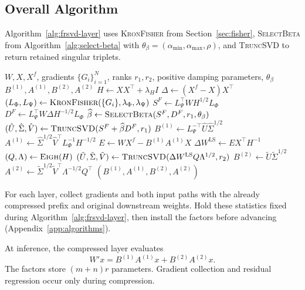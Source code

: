 \documentclass[11pt]{article}
\begin{document}
\subsection{Overall Algorithm}\label{sec:overall-algo}

Algorithm~\ref{alg:frsvd-layer} uses \textsc{KronFisher} from Section~\ref{sec:fisher}, \textsc{SelectBeta} from Algorithm~\ref{alg:select-beta} with $\theta_\beta=(\alpha_{\min},\alpha_{\max},\rho)$, and \textsc{TruncSVD} to return retained singular triplets.

\begin{algorithm}[t]
\caption{FR-SVD for one weight matrix}
\label{alg:frsvd-layer}
\small
\begin{algorithmic}[1]
\Require $W,X,X^f$, gradients $\{G_i\}_{i=1}^N$, ranks $r_1,r_2$, positive damping parameters, $\theta_\beta$
\Ensure $B^{(1)},A^{(1)},B^{(2)},A^{(2)}$
\State $H\gets XX^\top+\lambda_H I$
\State $\Delta\gets(X^f-X)X^\top$
\State $(L_\Phi,L_\Psi)\gets\Call{KronFisher}{\{G_i\},\lambda_\Phi,\lambda_\Psi}$
\State $S^F\gets L_\Psi^\top WH^{1/2}L_\Phi$
\State $D^F\gets L_\Psi^\top W\Delta H^{-1/2}L_\Phi$
\State $\widehat\beta\gets\Call{SelectBeta}{S^F,D^F,r_1,\theta_\beta}$
\State $(\hat U,\hat\Sigma,\hat V)\gets\Call{TruncSVD}{S^F+\widehat\beta D^F,r_1}$
\State $B^{(1)}\gets L_\Psi^{-\top}\hat U\hat\Sigma^{1/2}$
\State $A^{(1)}\gets\hat\Sigma^{1/2}\hat V^\top L_\Phi^{-1}H^{-1/2}$
\EndStage
{}
\State $E\gets WX^f-B^{(1)}A^{(1)}X$
\State $\Delta W^{\mathrm{LS}}\gets EX^\top H^{-1}$
\State $(Q,\Lambda)\gets\Call{Eigh}{H}$
\State $(\tilde U,\tilde\Sigma,\tilde V)\gets\Call{TruncSVD}{\Delta W^{\mathrm{LS}}Q\Lambda^{1/2},r_2}$
\State $B^{(2)}\gets\tilde U\tilde\Sigma^{1/2}$
\State $A^{(2)}\gets\tilde\Sigma^{1/2}\tilde V^\top\Lambda^{-1/2}Q^\top$
\EndStage
\State \Return $(B^{(1)},A^{(1)},B^{(2)},A^{(2)})$
\end{algorithmic}
\end{algorithm}

For each layer, collect gradients and both input paths with the already compressed prefix and original downstream weights. Hold these statistics fixed during Algorithm~\ref{alg:frsvd-layer}, then install the factors before advancing (Appendix~\ref{app:algorithms}).

At inference, the compressed layer evaluates
\begin{equation}
W'x=B^{(1)}A^{(1)}x+B^{(2)}A^{(2)}x.
\label{eq:deployment}
\end{equation}
The factors store $(m+n)r$ parameters. Gradient collection and residual regression occur only during compression.
\end{document}
